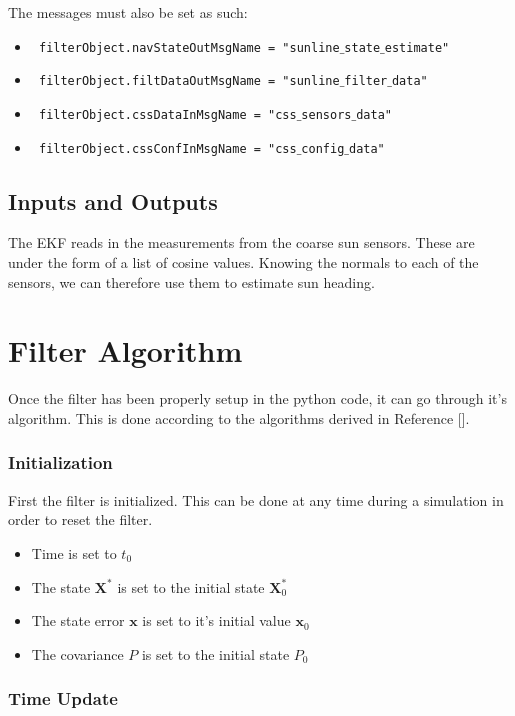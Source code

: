 \documentclass[]{BasiliskReportMemo}
\begin{document}
The messages must also be set as such:

\begin{itemize}
\item    \texttt{ filterObject.navStateOutMsgName = "sunline$\_$state$\_$estimate"}
\item    \texttt{ filterObject.filtDataOutMsgName = "sunline$\_$filter$\_$data"}
\item   \texttt{ filterObject.cssDataInMsgName = "css$\_$sensors$\_$data"}
\item   \texttt{ filterObject.cssConfInMsgName = "css$\_$config$\_$data"}
\end{itemize}

\subsection{Inputs and Outputs}

The EKF reads in the measurements from the coarse sun sensors. These are under the form of a list of cosine values. Knowing the normals to each of the sensors, we can therefore use them to estimate sun heading.

\section{Filter Algorithm}

Once the filter has been properly setup in the python code, it can go through it's algorithm. This is done according to the algorithms derived in Reference [].

\subsubsection*{Initialization}

First the filter is initialized. This can be done at any time during a simulation in order to reset 
the filter. 

\begin{itemize}
\item Time is set to $t_0$
\item The state $\bm X^*$ is set to the initial state  $\bm X_0^*$
\item The state error $\bm x$ is set to it's initial value $\bm x_0$
\item The covariance $P$ is set to the initial state  $P_0$
\end{itemize}


\subsubsection*{Time Update}
\end{document}
